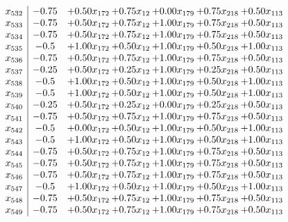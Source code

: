 \documentclass[8pt]{article}
\begin{document}
\[\begin{array}{c| c c@{\hskip 2pt} c@{\hskip 2pt} c@{\hskip 2pt} c@{\hskip 2pt} c@{\hskip 2pt} }
 x_{532}   &  -0.75 & +  0.50 x_{172} & +  0.75 x_{12} & +  0.00 x_{179} & +  0.75 x_{218} & +  0.50 x_{113}\\
 x_{533}   &  -0.75 & +  0.50 x_{172} & +  0.75 x_{12} & +  1.00 x_{179} & +  0.75 x_{218} & +  0.50 x_{113}\\
 x_{534}   &  -0.75 & +  0.50 x_{172} & +  0.75 x_{12} & +  1.00 x_{179} & +  0.75 x_{218} & +  0.50 x_{113}\\
 x_{535}   &  -0.5 & +  1.00 x_{172} & +  0.50 x_{12} & +  1.00 x_{179} & +  0.50 x_{218} & +  1.00 x_{113}\\
 x_{536}   &  -0.75 & +  0.50 x_{172} & +  0.75 x_{12} & +  1.00 x_{179} & +  0.75 x_{218} & +  0.50 x_{113}\\
 x_{537}   &  -0.25 & +  0.50 x_{172} & +  0.25 x_{12} & +  1.00 x_{179} & +  0.25 x_{218} & +  0.50 x_{113}\\
 x_{538}   &  -0.5 & +  1.00 x_{172} & +  0.50 x_{12} & +  1.00 x_{179} & +  0.50 x_{218} & +  1.00 x_{113}\\
 x_{539}   &  -0.5 & +  1.00 x_{172} & +  0.50 x_{12} & +  1.00 x_{179} & +  0.50 x_{218} & +  1.00 x_{113}\\
 x_{540}   &  -0.25 & +  0.50 x_{172} & +  0.25 x_{12} & +  0.00 x_{179} & +  0.25 x_{218} & +  0.50 x_{113}\\
 x_{541}   &  -0.75 & +  0.50 x_{172} & +  0.75 x_{12} & +  1.00 x_{179} & +  0.75 x_{218} & +  0.50 x_{113}\\
 x_{542}   &  -0.5 & +  0.00 x_{172} & +  0.50 x_{12} & +  1.00 x_{179} & +  0.50 x_{218} & +  1.00 x_{113}\\
 x_{543}   &  -0.5 & +  1.00 x_{172} & +  0.50 x_{12} & +  1.00 x_{179} & +  0.50 x_{218} & +  1.00 x_{113}\\
 x_{544}   &  -0.75 & +  0.50 x_{172} & +  0.75 x_{12} & +  1.00 x_{179} & +  0.75 x_{218} & +  0.50 x_{113}\\
 x_{545}   &  -0.75 & +  0.50 x_{172} & +  0.75 x_{12} & +  1.00 x_{179} & +  0.75 x_{218} & +  0.50 x_{113}\\
 x_{546}   &  -0.75 & +  0.50 x_{172} & +  0.75 x_{12} & +  1.00 x_{179} & +  0.75 x_{218} & +  0.50 x_{113}\\
 x_{547}   &  -0.5 & +  1.00 x_{172} & +  0.50 x_{12} & +  1.00 x_{179} & +  0.50 x_{218} & +  1.00 x_{113}\\
 x_{548}   &  -0.75 & +  0.50 x_{172} & +  0.75 x_{12} & +  1.00 x_{179} & +  0.75 x_{218} & +  0.50 x_{113}\\
 x_{549}   &  -0.75 & +  0.50 x_{172} & +  0.75 x_{12} & +  1.00 x_{179} & +  0.75 x_{218} & +  0.50 x_{113}\\

\end{array}\]
\end{document}
